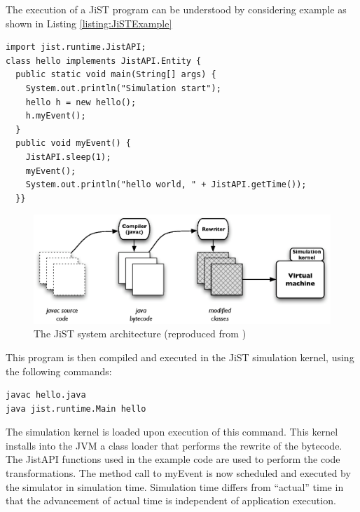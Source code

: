 The execution of a JiST program can be understood by considering example as
shown in Listing \ref{listing:JiSTExample}

\begin{lstlisting}[frame=trbl, basewidth={0.55em, 0.6em}, captionpos=b, 
basicstyle=\ttfamily\footnotesize, breaklines, caption = Example JiST program (reproduced from \cite{barr_JIST:2005}, label = listing:JiSTExample]  
import jist.runtime.JistAPI;  
class hello implements JistAPI.Entity { 
  public static void main(String[] args) { 
    System.out.println("Simulation start"); 
    hello h = new hello(); 
    h.myEvent(); 
  } 
  public void myEvent() { 
    JistAPI.sleep(1); 
    myEvent(); 
    System.out.println("hello world, " + JistAPI.getTime()); 
  }} 
\end{lstlisting}

\begin{figure}
\centering
\label{Fig:JiST_architecture}
\includegraphics[scale=0.72]{img/JiST_architecture.eps} \caption[The JiST 
System Architecture]{The JiST system architecture (reproduced from
\cite{barr_JIST:2005})}
\end{figure}  
 
This program is then compiled and executed in the JiST simulation
kernel, using the following commands:

  
\begin{lstlisting}[frame=trbl, basewidth={0.55em, 0.6em}, captionpos=b, 
basicstyle=\ttfamily\footnotesize, breaklines, caption = Execution of the
program in the JiST, label = listing:JiST ]  
javac hello.java
java jist.runtime.Main hello
\end{lstlisting}


The simulation kernel is loaded upon execution of this command. This kernel
installs into the JVM a class loader that performs the rewrite of the bytecode.
The JistAPI functions used in the example code are used to perform the
code transformations. The method call to myEvent is now scheduled and executed
by the simulator in simulation time. Simulation time differs from ``actual''
time in that the advancement of actual time is independent of application
execution. 
 
